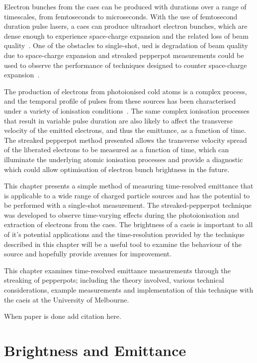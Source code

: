 Electron bunches from the \gls{caes} can be produced with durations over a range of timescales, from femtoseconds to microseconds.
With the use of femtosecond duration pulse lasers, a \gls{caes} can produce ultrashort electron bunches, which are dense enough to experience space-charge expansion and the related loss of beam quality~\cite{thompson_suppression_2016}.
One of the obstacles to single-shot, \gls{ued} is degradation of beam quality due to space-charge expansion and streaked pepperpot measurements could be used to observe the performance of techniques designed to counter space-charge expansion~\cite{thompson_suppression_2016}.

The production of electrons from photoionised cold atoms is a complex process, and the temporal profile of pulses from these sources has been characterised under a variety of ionisation conditions~\cite{speirs_identification_2017}.
The same complex ionisation processes that result in variable pulse duration are also likely to affect the transverse velocity of the emitted electrons, and thus the emittance, as a function of time.
The streaked pepperpot method presented allows the transverse velocity spread of the liberated electrons to be measured as a function of time, which can illuminate the underlying atomic ionisation processes and provide a diagnostic which could allow optimisation of electron bunch brightness in the future.

This chapter presents a simple method of measuring time-resolved emittance that is applicable to a wide range of charged particle sources and has the potential to be performed with a single-shot measurement.
The streaked-pepperpot technique was developed to observe time-varying effects during the photoionisation and extraction of electrons from the \gls{caes}.
The brightness of a \gls{caeis} is important to all of it's potential applications and the time-resolution provided by the technique described in this chapter will be a useful tool to examine the behaviour of the source and hopefully provide avenues for improvement.

This chapter examines time-resolved emittance measurements through the streaking of pepperpots; including the theory involved, various technical considerations, example measurements and implementation of this technique with the \gls{caeis} at the University of Melbourne.


{\color{red}When paper is done add citation here.}

\section{Brightness and Emittance}

